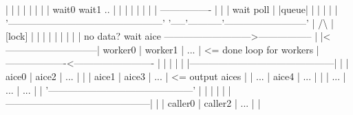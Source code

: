 \begin{DoxyPre}
      |   |                                            |    |  |  |           |    | wait0 wait1 .. |    |                                |
      |                                                |    |     |           |     ----------------     |                                |
      |                 wait poll                      |    |queue|           |      |         |         |                                |
      '------------------------------------------------'    '-----'-----------'--------------------------'                                |
                            /\textbackslash{}                                 |    [lock]           |         |                                          |
                            |                                  |                     |         |                                          |              
                            |     no data? wait aice        --------------------------->-----------------                                 |
                            |<-----------------------------|    worker0   |   worker1    |    ...        | <= done loop for workers       |
                                                            -------------------<-------------------------                                 |
                                                                  |             |              |                                          |
                                                           |---------------------------------------------|                                |
                                                           |    aice0    |    aice2     |     ...        |                                |
                                                           |    aice1    |    aice3     |     ...        | <= output aices                |
                                                           |     ...     |    aice4     |     ...        |                                |
                                                           |     ...     |     ...      |     ...        |                                |
                                                           '---------------------------------------------'                                |
                                                                  |              |              |                                         |         
                                                           |---------------------------------------------|                                |
                                                           |   caller0   |   caller2    |     ...        |                                |

\end{DoxyPre}
